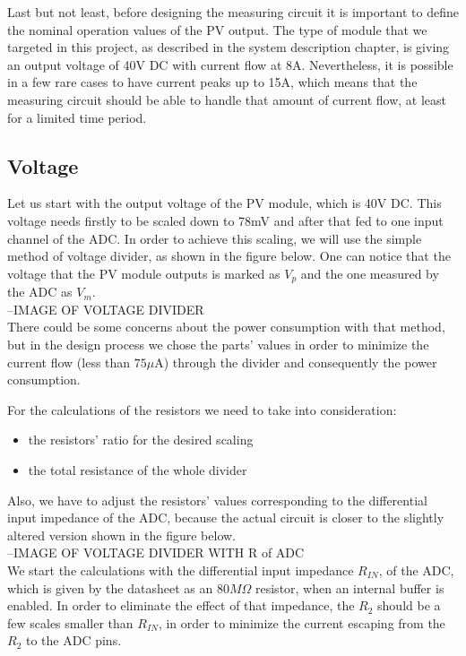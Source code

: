 Last but not least, before designing the measuring circuit it is important to define the nominal operation values of the PV output. The type of module that we targeted in this project, as described in the system description chapter, is giving an output voltage of 40V DC with current flow at 8A. Nevertheless, it is possible in a few rare cases to have current peaks up to 15A, which means that the measuring circuit should be able to handle that amount of current flow, at least for a limited time period.

\subsection{Voltage}
Let us start with the output voltage of the PV module, which is 40V DC. This voltage needs firstly to be scaled down to 78mV and after that fed to one input channel of the ADC. In order to achieve this scaling, we will use the simple method of voltage divider, as shown in the figure below. One can notice that the voltage that the PV module outputs is marked as $V_p$ and the one measured by the ADC as $V_m$.\\

--IMAGE OF VOLTAGE DIVIDER\\

There could be some concerns about the power consumption with that method, but in the design process we chose the parts’ values in order to minimize the current flow (less than $75\mu$A) through the divider and consequently the power consumption.

For the calculations of the resistors we need to take into consideration:

\begin{itemize}
    \item the resistors' ratio for the desired scaling
    \item the total resistance of the whole divider
\end{itemize}

Also, we have to adjust the resistors' values corresponding to the differential input impedance of the ADC, because the actual circuit is closer to the slightly altered version shown in the figure below.\\

--IMAGE OF VOLTAGE DIVIDER WITH R of ADC\\

We start the calculations with the differential input impedance $R_{IN}$, of the ADC, which is given by the datasheet as an $80M\Omega$ resistor, when an internal buffer is enabled. In order to eliminate the effect of that impedance, the $R_2$ should be a few scales smaller than $R_{IN}$, in order to minimize the current escaping from the $R_2$ to the ADC pins.

